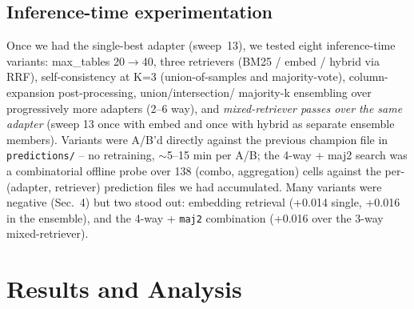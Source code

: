 \documentclass[10pt]{article}
\begin{document}
\subsection{Inference-time experimentation}
Once we had the single-best adapter (sweep~13), we tested eight inference-time
variants: max\_tables 20$\rightarrow$40, three retrievers (BM25 / embed /
hybrid via RRF), self-consistency at K=3 (union-of-samples and
majority-vote), column-expansion post-processing, union/intersection/
majority-k ensembling over progressively more adapters (2--6 way), and
\emph{mixed-retriever passes over the same adapter} (sweep 13 once with
embed and once with hybrid as separate ensemble members).
Variants were A/B'd directly against the previous champion file in
\texttt{predictions/} -- no retraining, $\sim$5--15 min per A/B; the
4-way + maj2 search was a combinatorial offline probe over 138 (combo,
aggregation) cells against the per-(adapter, retriever) prediction files
we had accumulated. Many variants were negative (Sec.~4) but two stood out:
embedding retrieval (+0.014 single, +0.016 in the ensemble), and the
4-way + \texttt{maj2} combination (+0.016 over the 3-way mixed-retriever).

\section{Results and Analysis}
\end{document}
